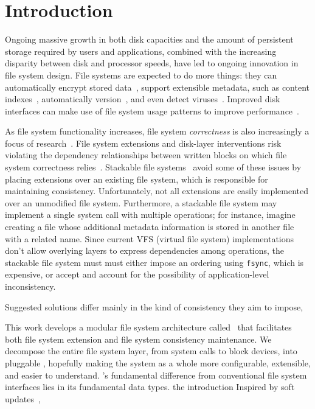 
\section {Introduction}
\label{sec:intro}


Ongoing massive growth in both disk capacities and the amount of persistent
 storage required by users and applications, combined with the increasing
 disparity between disk and processor speeds, have led to ongoing
 innovation in file system design.
%
File systems are expected to do more things: they can automatically encrypt
 stored data~\cite{wright03ncryptfs}, support extensible metadata, such as
 content indexes~\cite{xxx}, automatically
 version~\cite{soules03metadata,zadok,venti}, and even detect
 viruses~\cite{zadok}.
%
Improved disk interfaces can make use of file system usage patterns to
 improve
 performance~\cite{sivathanu03semantically-smart,sivathanu05database-aware}.



As file system functionality increases, file system \emph{correctness} is
 also increasingly a focus of
 research~\cite{abunchofmuthiansivathanu,denehy05journal-guided}.
%
File system extensions and disk-layer interventions risk violating
 the dependency relationships between written blocks on which file system
 correctness relies~\cite{ganger00soft,...}.
%
Stackable file
 systems~\cite{zadok00fist,zadok99extending,heidemann94filesystem,rosenthal90evolving}
 avoid some of these issues by placing extensions over an existing
 file system, which is responsible for maintaining consistency.
%
Unfortunately, not all extensions are easily implemented over an unmodified
 file system.
%
Furthermore, a stackable file system may implement a single system call
 with multiple operations; for instance, imagine creating a file whose
 additional metadata information is stored in another file with a related
 name.
%
Since current VFS (virtual file system) implementations don't allow
 overlying layers to express dependencies among operations, the stackable
 file system must must either impose an ordering using \texttt{fsync},
 which is expensive, or accept and account for the possibility of
 application-level inconsistency.
%

%
Suggested solutions differ mainly in the kind of consistency they aim to
 impose,



This work develops a modular file system architecture called \Kudos\ that
 facilitates both file system extension and file system consistency
 maintenance.
%
We decompose the entire file system layer, from system calls to block
 devices, into pluggable \modules, hopefully making the system as a whole
 more configurable, extensible, and easier to understand.
%
\Kudos's fundamental difference from conventional file system interfaces
 lies in its fundamental data types.
 the introduction
%
Inspired by soft updates~\cite{ganger00soft}, 




